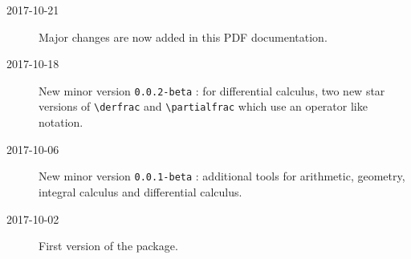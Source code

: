 \documentclass[12pt,a4paper]{article}
\theoremstyle{definition}
\begin{document}
\begin{description}
	\item[2017-10-21] Major changes are now added in this PDF documentation.

	\item[2017-10-18] New minor version \verb+0.0.2-beta+ : for differential calculus, two new star versions of \verb+\derfrac+ and \verb+\partialfrac+ which use an operator like notation.

	\item[2017-10-06] New minor version \verb+0.0.1-beta+ : additional tools for arithmetic, geometry, integral calculus and differential calculus.

	\item[2017-10-02] First version of the package.
\end{description}
\end{document}
